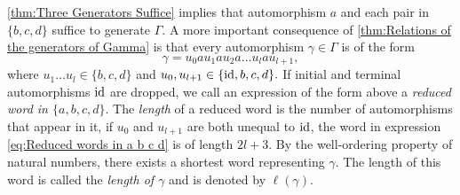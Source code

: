 \cref{thm:Three Generators Suffice} implies that automorphism $a$ and each pair in $\lbrace b,c,d\rbrace$ suffice to generate $\Gamma.$ A more important consequence of \cref{thm:Relations of the generators of Gamma} is that every automorphism $\gamma\in\Gamma$ is of the form
\begin{equation}\label{eq:Reduced words in a b c d}
\gamma=u_0au_1au_2a\ldots u_lau_{l+1},
\end{equation}
where $u_1\ldots u_{l}\in\lbrace b,c,d\rbrace$ and $u_0,u_{l+1}\in\lbrace \operatorname{id},b,c,d\rbrace.$ If initial and terminal automorphisms $\operatorname{id}$ are dropped, we call an expression of the form above a \emph{reduced word in $\lbrace a,b,c,d\rbrace$}. The \emph{length} of a reduced word is the number of automorphisms that appear in it, \eg if $u_0$ and $u_{l+1}$ are both unequal to $\operatorname{id}$, the word in expression \ref{eq:Reduced words in a b c d} is of length $2l+3$. By the well-ordering property of natural numbers, there exists a shortest word representing $\gamma$. The length of this word is called the \emph{length of $\gamma$} and is denoted by $\ell(\gamma)$. 